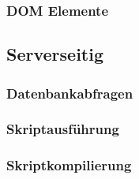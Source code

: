 \subsubsection{DOM Elemente}
\subsection{Serverseitig}
\subsubsection{Datenbankabfragen}
\subsubsection{Skriptausführung}
\subsubsection{Skriptkompilierung}





%
%